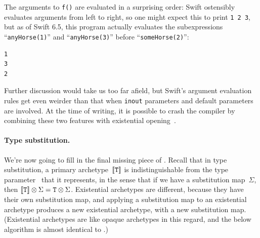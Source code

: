 \documentclass[../generics]{subfiles}
\begin{document}
\begin{example}
The arguments to \texttt{f()} are evaluated in a surprising order:
Swift ostensibly evaluates arguments from left to right, so one might expect this to print \verb|1 2 3|, but as of Swift 6.5, this program actually evaluates the subexpressions ``\texttt{anyHorse(1)}'' and ``\texttt{anyHorse(3)}'' before ``\texttt{someHorse(2)}'':
\begin{Verbatim}
1
3
2
\end{Verbatim}
Further discussion would take us too far afield, but Swift's argument evaluation rules get even weirder than that when \texttt{inout} parameters and default parameters are involved. At the time of writing, it is possible to crash the compiler by combining these two features with existential opening~\cite{issue65091}.
\end{example}

\paragraph{Type substitution.}
We're now going to fill in the final missing piece of . Recall that in type substitution, a primary archetype~$[\![\texttt{T}]\!]$ is indistinguishable from the type parameter \tT\ that it represents, in the sense that if we have a substitution map~$\Sigma$, then $[\![\texttt{T}]\!] \otimes \Sigma = \texttt{T} \otimes \Sigma$. Existential archetypes are different, because they have their own substitution map, and applying a substitution map to an existential archetype produces a new existential archetype, with a new substitution map. (Existential archetypes are like opaque archetypes in this regard, and the below algorithm is almost identical to .)
\end{document}
